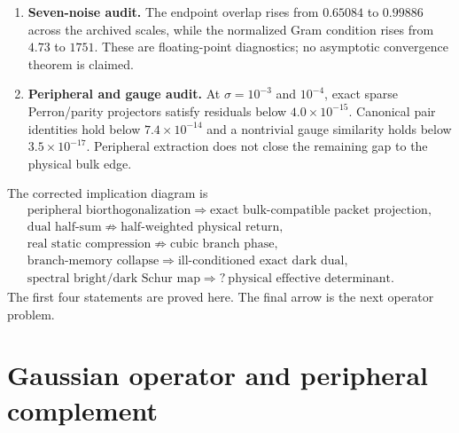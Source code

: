 \documentclass[11pt]{article}
\theoremstyle{definition}
\theoremstyle{remark}
\begin{document}
\begin{enumerate}[label=\textbf{B\arabic*.},leftmargin=3.2em]
 \item \textbf{Seven-noise audit.}
 The endpoint overlap rises from $0.65084$ to $0.99886$ across the archived
 scales, while the normalized Gram condition rises from $4.73$ to $1751$.
 These are floating-point diagnostics; no asymptotic convergence theorem is
 claimed.

 \item \textbf{Peripheral and gauge audit.}
 At $\sigma=10^{-3}$ and $10^{-4}$, exact sparse Perron/parity projectors
 satisfy residuals below $4.0\times10^{-15}$.  Canonical pair identities hold
 below $7.4\times10^{-14}$ and a nontrivial gauge similarity holds below
 $3.5\times10^{-17}$.  Peripheral extraction does not close the remaining
 gap to the physical bulk edge.
\end{enumerate}

The corrected implication diagram is
\begin{equation}\label{eq:logical-diagram}
 \boxed{
 \begin{gathered}
 \text{peripheral biorthogonalization}
 \Longrightarrow
 \text{exact bulk-compatible packet projection},\\
 \text{dual half-sum}
 \not\Longrightarrow
 \text{half-weighted physical return},\\
 \text{real static compression}
 \not\Longrightarrow
 \text{cubic branch phase},\\
 \text{branch-memory collapse}
 \Longrightarrow
 \text{ill-conditioned exact dark dual},\\
 \text{spectral bright/dark Schur map}
 \Longrightarrow?\
 \text{physical effective determinant}.
 \end{gathered}}
\end{equation}
The first four statements are proved here.  The final arrow is the next
operator problem.

\section{Gaussian operator and peripheral complement}
\label{sec:setup}
\end{document}
